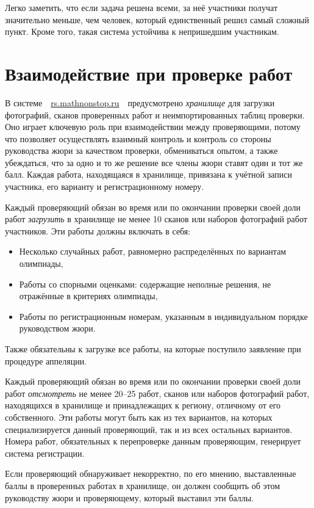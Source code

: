 \documentclass[a4paper,12pt]{article}
\begin{document}
Легко заметить, что если задача решена всеми, за неё участники получат значительно меньше, чем человек,
который единственный решил самый сложный пункт. Кроме того, такая система устойчива к непришедшим участникам.

\section{Взаимодействие при проверке работ}

В системе\ \ \url{rs.mathnonstop.ru}\ \ предусмотрено {\it хранилище} для загрузки фотографий, сканов проверенных работ и неимпортированных таблиц проверки. Оно играет ключевую роль при взаимодействии между проверяющими, потому что позволяет осуществлять взаимный контроль и контроль со стороны руководства жюри за качеством проверки, обмениваться опытом, а также убеждаться, что за одно и то же решение все члены жюри ставят один и тот же балл. Каждая работа, находящаяся в хранилище, привязана к учётной записи участника, его варианту и регистрационному номеру.

Каждый проверяющий обязан во время или по окончании проверки своей доли работ {\it загрузить} в хранилище не менее 10 сканов или наборов фотографий работ участников. Эти работы должны включать в себя: \vspace{-4mm}

\begin{itemize}
	\item Несколько случайных работ, равномерно распределённых по вариантам олимпиады,
	\item Работы со спорными оценками: содержащие неполные решения, не отражённые в критериях олимпиады,
	\item Работы по регистрационным номерам, указанным в индивидуальном порядке руководством жюри.
\end{itemize}

Также обязательны к загрузке все работы, на которые поступило заявление при процедуре аппеляции.

Каждый проверяющий обязан во время или по окончании проверки своей доли работ {\it отсмотреть} не менее 20–25 работ, сканов или наборов фотографий работ, находящихся в хранилище и принадлежащих к региону, отличному от его собственного. Эти работы могут быть как из тех вариантов, на которых специализируется данный проверяющий, так и из всех остальных вариантов. Номера работ, обязательных к перепроверке данным проверяющим, генерирует система регистрации.

Если проверяющий обнаруживает некорректно, по его мнению, выставленные баллы в проверенных работах в хранилище, он должен сообщить об этом руководству жюри и проверяющему, который выставил эти баллы.
\end{document}
